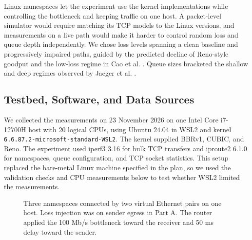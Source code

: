\documentclass[11pt,a4paper]{article}
\newcommand{\reporttextsize}{\fontsize{11.2}{13.6}\selectfont}
\begin{document}
Linux namespaces let the experiment use the kernel implementations while controlling the bottleneck and keeping traffic on one host. A packet-level simulator would require matching its TCP models to the Linux versions, and measurements on a live path would make it harder to control random loss and queue depth independently. We chose loss levels spanning a clean baseline and progressively impaired paths, guided by the predicted decline of Reno-style goodput and the low-loss regime in Cao et al. \cite{mathis1997,cao2019}. Queue sizes bracketed the shallow and deep regimes observed by Jaeger et al. \cite{jaeger2019}.

\subsection{Testbed, Software, and Data Sources}

We collected the measurements on 23 November 2026 on one Intel Core i7-12700H host with 20 logical CPUs, using Ubuntu 24.04 in WSL2 and kernel \texttt{6.6.87.2-microsoft-standard-WSL2}. The kernel supplied BBRv1, CUBIC, and Reno. The experiment used iperf3 3.16 for bulk TCP transfers and iproute2 6.1.0 for namespaces, queue configuration, and TCP socket statistics. This setup replaced the bare-metal Linux machine specified in the plan, so we used the validation checks and CPU measurements below to test whether WSL2 limited the measurements.

\begin{figure}[!htbp]
\centering
{}
\caption{Three namespaces connected by two virtual Ethernet pairs on one host. Loss injection was on sender egress in Part A. The router applied the 100 Mb/s bottleneck toward the receiver and 50 ms delay toward the sender.}
\label{fig:testbed}
\end{figure}
\end{document}
